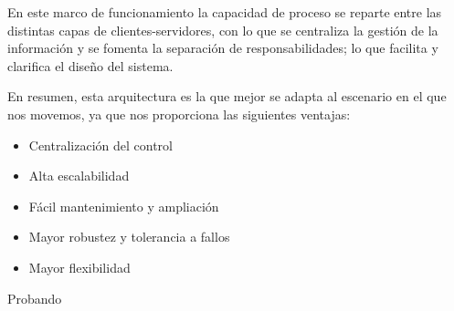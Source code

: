 En este marco de funcionamiento la capacidad de proceso se reparte entre las distintas capas de clientes-servidores, con lo que se centraliza la gestión de la información y se fomenta la separación de responsabilidades; lo que facilita y clarifica el diseño del sistema.
 
 En resumen, esta arquitectura es la que mejor se adapta al escenario en el que nos movemos, ya que nos proporciona las siguientes ventajas:
 \begin{itemize}
 	\item Centralización del control
 	\item Alta escalabilidad
 	\item Fácil mantenimiento y ampliación
 	\item Mayor robustez y tolerancia a fallos
 	\item Mayor flexibilidad
 \end{itemize}


Probando






